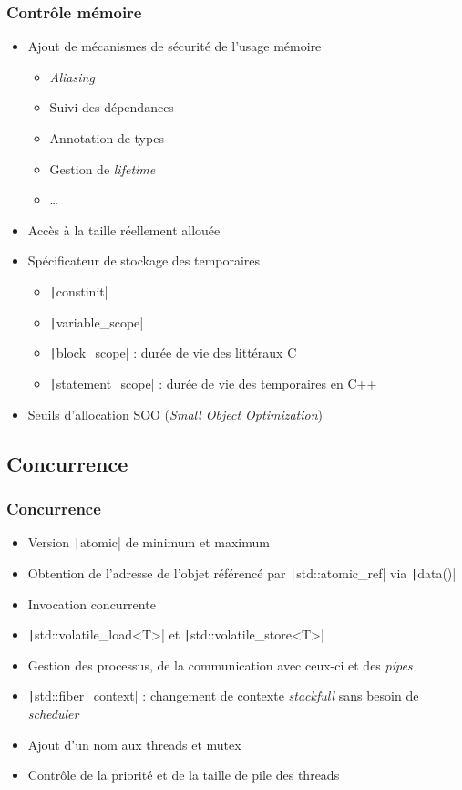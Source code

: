 \documentclass[C++.tex]{subfiles}
\begin{document}
\begin{frame}[fragile]
	\frametitle{Contrôle mémoire}
	\begin{itemize}
		\item Ajout de mécanismes de sécurité de l'usage mémoire


		\begin{itemize}
			\item \textit{Aliasing}
			\item Suivi des dépendances
			\item Annotation de types
			\item Gestion de \textit{lifetime}
			\item \ldots
		\end{itemize}

		\item Accès à la taille réellement allouée
		\item Spécificateur de stockage des temporaires 
		\begin{itemize}
			\item \texttt|constinit|
			\item \texttt|variable_scope|
			\item \texttt|block_scope| : durée de vie des littéraux C
			\item \texttt|statement_scope| : durée de vie des temporaires en C++
		\end{itemize}
		\item Seuils d'allocation SOO (\textit{Small Object Optimization})
	\end{itemize}
\end{frame}

\subsection*{Concurrence}
\begin{frame}[fragile]
	\frametitle{Concurrence}
	\begin{itemize}
		\item Version \texttt|atomic| de minimum et maximum
		\item Obtention de l'adresse de l'objet référencé par \texttt|std::atomic_ref| via \texttt|data()|
		\item Invocation concurrente
		\item \texttt|std::volatile_load<T>| et \texttt|std::volatile_store<T>|
		\item Gestion des processus, de la communication avec ceux-ci et des \textit{pipes}
		\item \texttt|std::fiber_context| : changement de contexte \textit{stackfull} sans besoin de \textit{scheduler}
		\item Ajout d'un nom aux threads et mutex
		\item Contrôle de la priorité et de la taille de pile des threads
	\end{itemize}
\end{frame}
\end{document}
